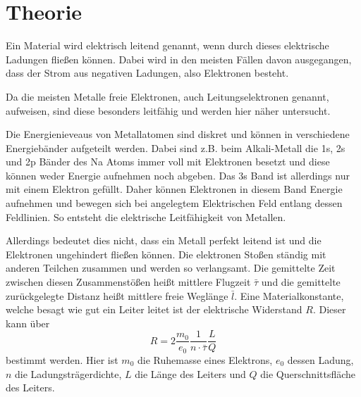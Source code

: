 \section{Theorie}
\label{sec:Theorie}






Ein Material wird elektrisch leitend genannt, wenn durch dieses elektrische Ladungen fließen können.
Dabei wird in den meisten Fällen davon ausgegangen, dass der Strom aus negativen Ladungen, also Elektronen besteht.

Da die meisten Metalle freie Elektronen, auch Leitungselektronen genannt, aufweisen, sind diese besonders leitfähig und werden hier näher untersucht.

Die Energienieveaus von Metallatomen sind diskret und können in verschiedene Energiebänder aufgeteilt werden. 
Dabei sind z.B. beim Alkali-Metall die 1s, 2s und 2p Bänder des Na Atoms immer voll mit Elektronen besetzt und diese können weder Energie aufnehmen noch abgeben.
Das 3s Band ist allerdings nur mit einem Elektron gefüllt. 
Daher können Elektronen in diesem Band Energie aufnehmen und bewegen sich bei angelegtem Elektrischen Feld entlang dessen Feldlinien.
So entsteht die elektrische Leitfähigkeit von Metallen. \cite{V311}

Allerdings bedeutet dies nicht, dass ein Metall perfekt leitend ist und die Elektronen ungehindert fließen können.
Die elektronen Stoßen ständig mit anderen Teilchen zusammen und werden so verlangsamt.
Die gemittelte Zeit zwischen diesen Zusammenstößen heißt mittlere Flugzeit $\bar{\tau}$ und die gemittelte zurückgelegte Distanz heißt mittlere freie Weglänge $\bar{l}$.
Eine Materialkonstante, welche besagt wie gut ein Leiter leitet ist der elektrische Widerstand $R$.
Dieser kann über
\begin{equation}
    R = 2\frac{m_0}{e_0}\frac{1}{n \cdot \bar{\tau}}\frac{L}{Q}
    \label{eq:widerstand}
\end{equation}
bestimmt werden. 
Hier ist $m_0$ die Ruhemasse eines Elektrons, $e_0$ dessen Ladung, $n$ die Ladungsträgerdichte, $L$ die Länge des Leiters und $Q$ die Querschnittsfläche des Leiters. \cite{V311}

